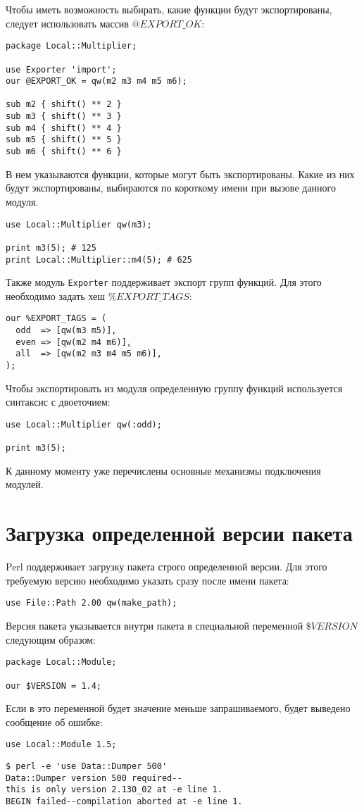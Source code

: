 Чтобы иметь возможность выбирать, какие функции будут экспортированы, следует использовать массив $@EXPORT\_OK$:
\begin{verbatim}
package Local::Multiplier;

use Exporter 'import';
our @EXPORT_OK = qw(m2 m3 m4 m5 m6);

sub m2 { shift() ** 2 }
sub m3 { shift() ** 3 }
sub m4 { shift() ** 4 }
sub m5 { shift() ** 5 }
sub m6 { shift() ** 6 }
\end{verbatim}
В нем указываются функции, которые могут быть экспортированы. Какие из них будут экспортированы, выбираются по короткому имени при вызове данного модуля.
\begin{verbatim}
use Local::Multiplier qw(m3);

print m3(5); # 125
print Local::Multiplier::m4(5); # 625
\end{verbatim}

Также модуль \verb|Exporter| поддерживает экспорт групп функций. Для этого необходимо задать хеш $\%EXPORT\_TAGS$:
\begin{verbatim}
our %EXPORT_TAGS = (
  odd  => [qw(m3 m5)],
  even => [qw(m2 m4 m6)],
  all  => [qw(m2 m3 m4 m5 m6)],
);
\end{verbatim}
Чтобы экспортировать из модуля определенную группу функций используется синтаксис с двоеточием:
\begin{verbatim}
use Local::Multiplier qw(:odd);

print m3(5);
\end{verbatim}
К данному моменту уже перечислены основные механизмы подключения модулей.

\section{Загрузка определенной версии пакета}
Perl поддерживает загрузку пакета строго определенной версии. Для этого требуемую версию необходимо указать сразу после имени пакета:
\begin{verbatim}
use File::Path 2.00 qw(make_path);
\end{verbatim}
Версия пакета указывается внутри пакета в специальной переменной $\$VERSION$ следующим образом:
\begin{verbatim}
package Local::Module;

our $VERSION = 1.4;
\end{verbatim}
Если в это переменной будет значение меньше запрашиваемого, будет выведено сообщение об ошибке:
\begin{verbatim}
use Local::Module 1.5;
\end{verbatim}
\begin{verbatim}
$ perl -e 'use Data::Dumper 500'
Data::Dumper version 500 required--
this is only version 2.130_02 at -e line 1.
BEGIN failed--compilation aborted at -e line 1.
\end{verbatim}

